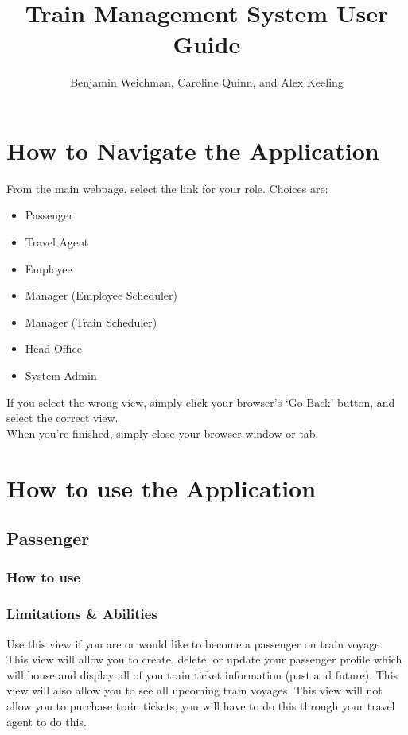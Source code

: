 \documentclass[letter]{article}
\title{Train Management System User Guide}
\author{Benjamin Weichman, Caroline Quinn, and Alex Keeling}
\date{}
\begin{document}
\maketitle

\section{How to Navigate the Application}
From the main webpage, select the link for your role. Choices are: 
\begin{itemize}
\item Passenger
\item Travel Agent
\item Employee
\item Manager (Employee Scheduler)
\item Manager (Train Scheduler)
\item Head Office
\item System Admin
\end{itemize}

If you select the wrong view, simply click your browser's `Go Back' button, and select the correct view. \\

When you're finished, simply close your browser window or tab.


\section{How to use the Application}

\subsection{Passenger}
\subsubsection{How to use}

\subsubsection{Limitations \& Abilities}
Use this view if you are or would like to become a passenger on train voyage. This view will allow you to create, delete, or update your passenger profile which will house and display all of you train ticket information (past and future).  This view will also allow you to see all upcoming train voyages. This view will not allow you to purchase train tickets, you will have to do this through your travel agent to do this. 
\end{document}
